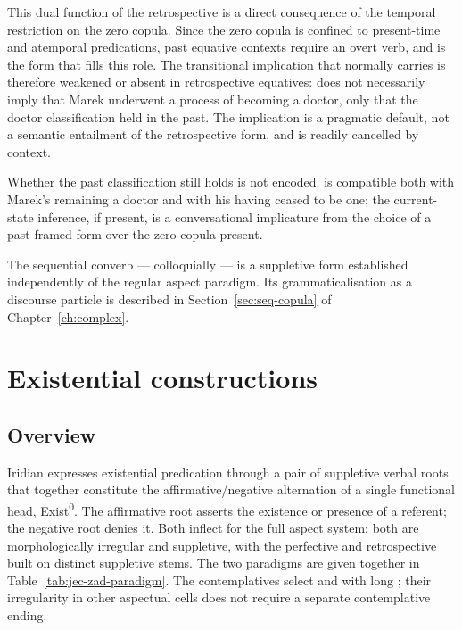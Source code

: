 This dual function of the retrospective is a direct consequence of the temporal
restriction on the zero copula. Since the zero copula is confined to
present-time and atemporal predications, past equative contexts require an overt
verb, and  is the form that fills this role. The transitional
implication that  normally carries is therefore weakened or absent in
retrospective equatives:  does not necessarily imply that
Marek underwent a process of becoming a doctor, only that the doctor
classification held in the past. The implication is a pragmatic default, not a
semantic entailment of the retrospective form, and is readily cancelled by
context.

Whether the past classification still holds is not encoded.  is compatible both with Marek's remaining a doctor and with his having
ceased to be one; the current-state inference, if present, is a conversational
implicature from the choice of a past-framed form over the zero-copula present.

The sequential converb  --- colloquially  --- is a suppletive
form established independently of the regular aspect paradigm. Its
grammaticalisation as a discourse particle is described in
Section~\ref{sec:seq-copula} of Chapter~\ref{ch:complex}.

\section{Existential constructions}
\label{sec:existential-constructions}

\subsection{Overview}
\label{sec:existential-overview}%
\label{sec:jec}%
\label{sec:zad}%
\label{sec:jec-zad}%

Iridian expresses existential predication through a pair of suppletive verbal
roots that together constitute the affirmative/negative alternation of a single
functional head, Exist\textsuperscript{0}. The affirmative root 
asserts the existence or presence of a referent; the negative root 
denies it. Both inflect for the full aspect system; both are morphologically
irregular and suppletive, with the perfective and retrospective built on
distinct suppletive stems. The two paradigms are given together in
Table~\ref{tab:jec-zad-paradigm}. The contemplatives select
 and  with long ; their irregularity in
other aspectual cells does not require a separate contemplative ending.


